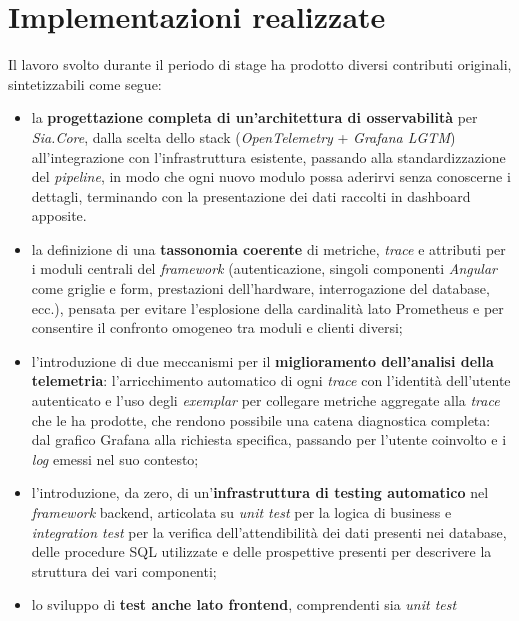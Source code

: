 \section{Implementazioni realizzate}
\label{sec:contributi}

Il lavoro svolto durante il periodo di stage ha prodotto diversi contributi
originali, sintetizzabili come segue:

\begin{itemize}
      \item la \textbf{progettazione completa di un'architettura di
                  osservabilità} per \emph{Sia.Core}, dalla scelta dello stack
            (\emph{OpenTelemetry} + \emph{Grafana LGTM}) all'integrazione con
            l'infrastruttura esistente, passando alla standardizzazione del
            \emph{pipeline}, in modo che ogni nuovo modulo possa aderirvi
            senza conoscerne i dettagli, terminando con la presentazione dei dati
            raccolti in dashboard apposite.
      \item la definizione di una \textbf{tassonomia coerente} di metriche,
            \emph{trace} e attributi per i moduli centrali del \emph{framework}
            (autenticazione, singoli componenti \emph{Angular} come griglie e form,
            prestazioni dell'hardware, interrogazione del database, ecc.), pensata per evitare l'esplosione
            della cardinalità lato Prometheus e per consentire il confronto
            omogeneo tra moduli e clienti diversi;
      \item l'introduzione di due meccanismi per il \textbf{miglioramento dell'analisi
                  della telemetria}: l'arricchimento automatico di ogni \emph{trace} con
            l'identità dell'utente autenticato e l'uso degli \emph{exemplar}
            per collegare metriche aggregate alla \emph{trace} che le ha
            prodotte, che rendono possibile una catena diagnostica
            completa: dal grafico Grafana alla richiesta specifica, passando
            per l'utente coinvolto e i \emph{log} emessi nel suo contesto;
      \item l'introduzione, da zero, di un'\textbf{infrastruttura di testing
                  automatico} nel \emph{framework} backend, articolata su \emph{unit test}
            per la logica di business e \emph{integration test} per la verifica
            dell'attendibilità dei dati presenti nei database, delle procedure SQL utilizzate
            e delle prospettive presenti per descrivere la struttura dei vari componenti;
      \item lo sviluppo di \textbf{test anche lato frontend}, comprendenti sia \emph{unit test}

\end{itemize}
